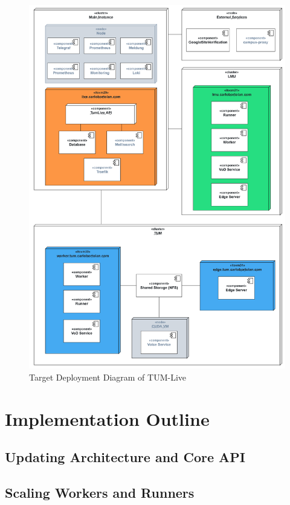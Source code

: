 \begin{figure}[htpb]
    \centering
    \includegraphics[width=\textwidth]{images/DeploymentDiagram.png}
    \caption[Target System Architecture]{Target Deployment Diagram of TUM-Live}\label{fig:system-architecture}
\end{figure}

\newpage


\section{Implementation Outline}

\subsection{Updating Architecture and Core API}

\subsection{Scaling Workers and Runners}

